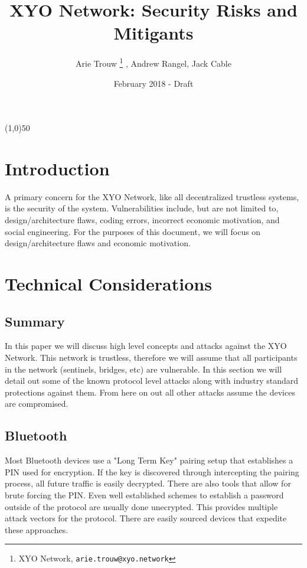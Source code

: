 \documentclass{article}
\title {XYO Network: Security Risks and Mitigants}
\author{
    Arie Trouw \thanks{XYO Network, \texttt{arie.trouw@xyo.network}} , Andrew Rangel, Jack Cable
}
\date{February 2018 - Draft}
\begin{document}
\pagecolor{lightred}

\maketitle

\begin{center}
\line(1,0){50}
\end{center}

\section{Introduction}
A primary concern for the XYO Network, like all decentralized trustless systems, is the security of the system.  Vulnerabilities include, but are not limited to, design/architecture flaws, coding errors, incorrect economic motivation, and social engineering. For the purposes of this document, we will focus on design/architecture flaws and economic motivation.

\section {Technical Considerations}
\subsection{Summary}
In this paper we will discuss high level concepts and attacks against the XYO Network. This network is trustless, therefore we will assume that all participants in the network (sentinels, bridges, etc) are vulnerable. In this section we will detail out some of the known protocol level attacks along with industry standard protections against them. From here on out all other attacks assume the devices are compromised.

\subsection{Bluetooth}
Most Bluetooth devices use a "Long Term Key" pairing setup that establishes a PIN used for encryption. If the key is discovered through intercepting the pairing process, all future traffic is easily decrypted. There are also tools that allow for brute forcing the PIN. Even well established schemes to establish a password outside of the protocol are usually done unecrypted. This provides multiple attack vectors for the protocol. There are easily sourced devices that expedite these approaches.
\end{document}
